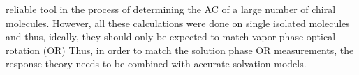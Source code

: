 reliable tool in the process of determining the AC of a large number of chiral molecules\cite{Kondru99}. 
However, all these calculations were done on single isolated molecules and thus, ideally, they should only be expected to match vapor phase optical rotation (OR) 
Thus, in order to match the solution phase OR measurements, the response theory needs to be combined with accurate solvation models. \\ 
%
%
%
%

